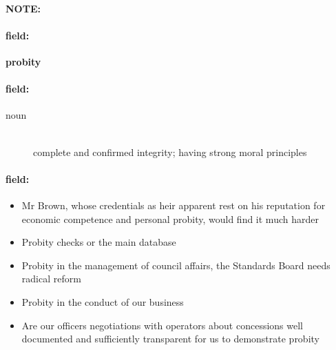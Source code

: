 \documentclass[12pt]{article}
\newenvironment{note}{\paragraph{NOTE:}}{}
\newenvironment{field}{\paragraph{field:}}{}
\begin{document}
\begin{note}
\begin{field}
\textbf{\large probity}
\end{field}


\begin{field}
\begin{description}
\item[noun] \hfill \\ 
complete and confirmed integrity; having strong moral principles

\end{description}
\end{field}

\begin{field}
\begin{itemize}
\item Mr Brown, whose credentials as heir apparent rest on his reputation for economic competence and personal probity, would find it much harder
\item Probity checks or the main database
\item Probity in the management of council affairs, the Standards Board needs radical reform
\item Probity in the conduct of our business
\item Are our officers negotiations with operators about concessions well documented and sufficiently transparent for us to demonstrate probity
\end{itemize}
\end{field}
\end{note}
\end{document}
